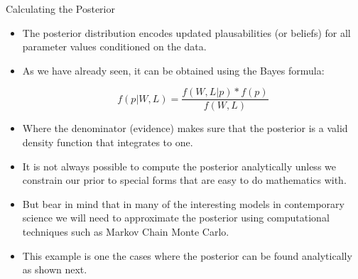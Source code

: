 \documentclass[handout]{beamer}
\begin{document}
\begin{frame}{Calculating the Posterior}
\scriptsize{

\begin{itemize}

\item The posterior distribution encodes updated plausabilities (or beliefs) for all parameter values conditioned on the data.
\item As we have already seen, it can be obtained using the Bayes formula:

\begin{displaymath}
 f(p|W,L) = \frac{f(W,L|p)* f(p)}{f(W,L)}
\end{displaymath}

\item Where the denominator (evidence) makes sure that the posterior is a valid density function that integrates to one.

\item It is not always possible to compute the posterior analytically unless we constrain our prior to special forms that are easy to do mathematics with.

\item But bear in mind that in many of the interesting models in contemporary science we will need to approximate the posterior using computational techniques such as Markov Chain Monte Carlo. 

\item This example is one the cases where the posterior can be found analytically as shown next.

\end{itemize}

} 


\end{frame}
\end{document}

